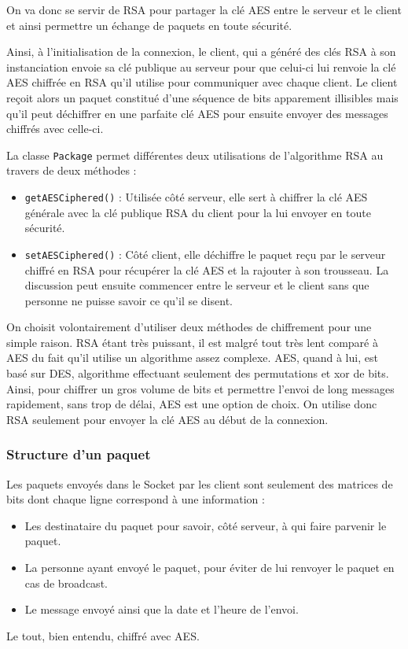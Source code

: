 \documentclass{article}
\begin{document}
On va donc se servir de RSA pour partager la clé AES entre le serveur et le client et ainsi permettre un échange de paquets en toute sécurité. 

Ainsi, à l'initialisation de la connexion, le client, qui a généré des clés RSA à son instanciation envoie sa clé publique 
au serveur pour que celui-ci lui renvoie la clé AES chiffrée en RSA qu'il utilise pour communiquer avec chaque client. 
Le client reçoit alors un paquet constitué d'une séquence de bits apparement illisibles mais qu'il peut déchiffrer en une parfaite 
clé AES pour ensuite envoyer des messages chiffrés avec celle-ci. 

La classe \texttt{Package} permet différentes deux utilisations de l'algorithme RSA au travers de deux méthodes :
\begin{itemize}
    \item \texttt{getAESCiphered()} : Utilisée côté serveur, elle sert à chiffrer la clé AES générale avec la clé publique RSA 
    du client pour la lui envoyer en toute sécurité. 
    \item \texttt{setAESCiphered()} : Côté client, elle déchiffre le paquet reçu par le serveur chiffré en RSA pour récupérer la clé AES 
    et la rajouter à son trousseau. La discussion peut ensuite commencer entre le serveur et le client sans que personne ne puisse savoir ce qu'il se disent.
\end{itemize}

On choisit volontairement d'utiliser deux méthodes de chiffrement pour une simple raison. 
RSA étant très puissant, il est malgré tout très lent comparé à AES du fait qu'il utilise un algorithme assez complexe. 
AES, quand à lui, est basé sur DES, algorithme effectuant seulement des permutations et xor de bits. 
Ainsi, pour chiffrer un gros volume de bits et permettre l'envoi de long messages rapidement, sans trop de délai, AES est une option de choix. 
On utilise donc RSA seulement pour envoyer la clé AES au début de la connexion. 


\subsubsection{Structure d'un paquet}

Les paquets envoyés dans le Socket par les client sont seulement des matrices de bits dont chaque ligne correspond à une information :
\begin{itemize}
    \item Les destinataire du paquet pour savoir, côté serveur, à qui faire parvenir le paquet. 
    \item La personne ayant envoyé le paquet, pour éviter de lui renvoyer le paquet en cas de broadcast. 
    \item Le message envoyé ainsi que la date et l'heure de l'envoi. 
\end{itemize}
Le tout, bien entendu, chiffré avec AES. 
\end{document}
